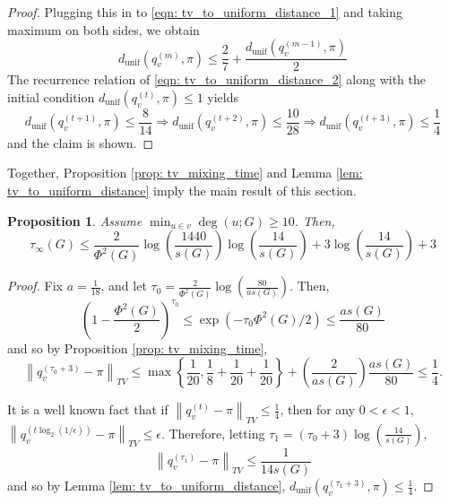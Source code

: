 \documentclass[11pt,twoside]{article}
\newtheorem{proposition}{Proposition}
\newcommand{\set}[1]{\left\{#1\right\}}
\newcommand{\norm}[1]{\left\lVert#1\right\rVert}
\newcommand{\1}{\mathbf{1}}
\begin{document}
\begin{proof}
	Plugging this in to \eqref{eqn: tv_to_uniform_distance_1} and taking maximum on both sides, we obtain
	\begin{equation}
	d_{\textrm{unif}}(q_v^{(m)}, \pi) \leq \frac{2}{7} + \frac{d_{\textrm{unif}}(q_v^{(m - 1)}, \pi)}{2} \label{eqn: tv_to_uniform_distance_2}
	\end{equation}
	The recurrence relation of \eqref{eqn: tv_to_uniform_distance_2} along with the initial condition $d_{\textrm{unif}}(q_v^{(t)}, \pi) \leq 1$ yields
	\begin{equation*}
	d_{\textrm{unif}}(q_v^{(t + 1)}, \pi) \leq \frac{8}{14} \Rightarrow d_{\textrm{unif}}(q_v^{(t + 2)}, \pi) \leq \frac{10}{28} \Rightarrow  d_{\textrm{unif}}(q_v^{(t + 3)}, \pi) \leq \frac{1}{4}
	\end{equation*}
	and the claim is shown.
\end{proof}

Together, Proposition \ref{prop: tv_mixing_time} and Lemma \ref{lem: tv_to_uniform_distance} imply the main result of this section.

\begin{proposition}
	\label{prop: pointwise_mixing_time}
	Assume $\min_{u \in v} \deg(u; G) \geq 10$. Then,
	\begin{equation*}
	\tau_{\infty}(G) \leq \frac{2}{\Phi^2(G)} \log \left(\frac{1440}{s(G)}\right)\log \left(\frac{14}{s(G)}\right)  + 3 \log \left(\frac{14}{s(G)}\right) + 3
	\end{equation*}
\end{proposition}
\begin{proof}
	Fix $a = \frac{1}{18}$, and let $\tau_0 = \frac{2}{\Phi^2(G)} \log \left(\frac{80}{a s(G)}\right)$. Then,
	\begin{equation*}
	\left(1 - \frac{\Phi^2(G)}{2}\right)^{\tau_0} \leq \exp(- \tau_0\Phi^2(G)/2) \leq \frac{as(G)}{80}
	\end{equation*}
	and so by Proposition \ref{prop: tv_mixing_time},
	\begin{equation*}
	\norm{q_v^{(\tau_0 + 3)} - \pi}_{TV} \leq \max \set{\frac{1}{20}, \frac{1}{8} + \frac{1}{20} + \frac{1}{20}} + \left(\frac{2}{as(G)}\right) \frac{as(G)}{80} \leq \frac{1}{4}.
	\end{equation*}
	
	It is a well known fact \cite{montenegro2002} that if $\norm{q_v^{(t)} - \pi}_{TV} \leq \frac{1}{4}$, then for any $0 < \epsilon < 1$, $\norm{q_v^{(t\log_2(1/\epsilon))} - \pi}_{TV} \leq \epsilon$. Therefore, letting $\tau_1 = (\tau_0 + 3) \log(\frac{14}{s(G)})$, 
	\begin{equation*}
	\norm{q_v^{(\tau_1)} - \pi}_{TV} \leq \frac{1}{14 s(G)}
	\end{equation*}
	and so by Lemma \ref{lem: tv_to_uniform_distance}, $d_{\textrm{unif}}(q_v^{(\tau_1 + 3)}, \pi) \leq \frac{1}{4}$. 
\end{proof}
\end{document}
